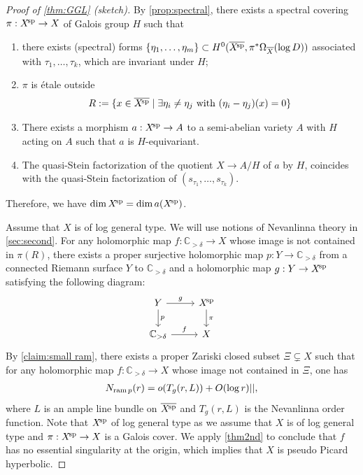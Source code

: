 \documentclass[english]{amsproc}
\theoremstyle{plain}
\theoremstyle{definition}
\theoremstyle{remark}
\theoremstyle{plain}
\numberwithin{equation}{thm} %
\newcommand{\bC}{\mathbb{C}}
\newcommand{\xsp}{X^{\! \rm sp}}
\begin{document}
\begin{proof}[Proof of \cref{thm:GGL} (sketch)]
		
		By \cref{prop:spectral}, there exists a spectral covering $\pi:\xsp\to X$ of Galois group $H$ such that 
		\begin{enumerate}[label={\rm (\alph*)}]
			\item \label{itea} there exists (spectral) forms $\{\eta_1,\ldots,\eta_m\} \subset H^0(\overline{\xsp}, \pi^*\Omega_{\overline{X}}(\log D))$ associated with $\tau_1,\ldots,\tau_k$, which are invariant under $H$;
			\item  \label{iteb}$\pi$ is \'etale outside  
			\begin{align}\label{eq:rami}
				R:=\{x\in \overline{\xsp} \mid \exists \eta_{i}\neq\eta_j  \mbox{ with }(\eta_i-\eta_j)(x)=0\} 
			\end{align}
			\item \label{itec}There exists a morphism $a:\xsp\to A$ to a semi-abelian variety $A$ with $H$ acting on $A$  such that $a$ is $H$-equivariant.
			\item \label{ited} The quasi-Stein factorization of the quotient $X\to A/H$ of $a$ by $H$, coincides with the   quasi-Stein factorization of $(s_{\tau_1},\ldots, s_{\tau_k})$.
		\end{enumerate}    Therefore, we have   $\dim \xsp=\dim a(\xsp)$.  
		
		Assume that $X$ is of log general type. 
		We will use   notions of Nevanlinna theory   in \cref{sec:second}.   
		For  any holomorphic map $f:\bC_{>\delta}\to X$ whose image is not contained in $\pi(R)$, there exists  a proper surjective holomorphic map   $p:Y\to \bC_{>\delta}$  from a connected Riemann surface $Y$ to  $\bC_{>\delta}$ and  a  holomorphic map $g:Y\to \xsp$  satisfying the following diagram:
		\begin{equation}\label{figure:curve}
			\begin{tikzcd}
				Y\arrow[r, "g"] \arrow[d, "p"] & \xsp\arrow[d, "\pi"]\\
				\bC_{>\delta}\arrow[r, "f"] & X
			\end{tikzcd}
		\end{equation}By \cref{claim:small ram},  there exists a proper Zariski closed subset $\Xi\subsetneq X$ such that for  any holomorphic map $f:\bC_{>\delta}\to X$ whose image not contained in $\Xi$,  
		one has  
		\begin{align*} 
			N_{{\rm ram}\, p}(r) =o( T_{g}(r,L)) + O(\log r) ||,
		\end{align*}  
		where $L$ is an ample line bundle on $\overline{\xsp}$  and $T_g(r,L)$ is the Nevanlinna order function.  
		Note that $\xsp$ of log general type as we assume that $X$ is of log general type and $\pi:\xsp\to X$ is a Galois cover.  We apply \cref{thm2nd} to conclude that $f$ has no essential singularity at the origin,
		which implies that $X$ is pseudo Picard hyperbolic.
		

\end{proof}
\end{document}
